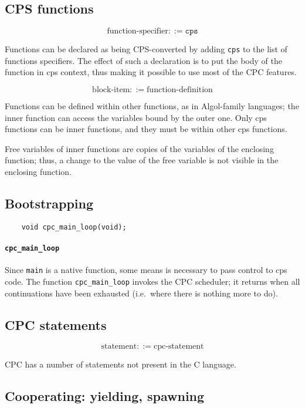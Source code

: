 \documentclass[a4paper]{report}
\begin{document}
\subsection{CPS functions} \label{sec:cpc-functions}

\[ \mbox{function-specifier} ::= \mathtt{cps} \]

Functions can be declared as being CPS-converted by adding {\tt cps}
to the list of functions specifiers.  The effect of such a declaration
is to put the body of the function in cps context, thus making it
possible to use most of the CPC features.

\[ \mbox{block-item} ::= \mbox{function-definition} \]

Functions can be defined within other functions, as in Algol-family
languages; the inner function can access the variables bound by the
outer one.  Only cps functions can be inner functions, and they must
be within other cps functions.

Free variables of inner functions are copies of the variables of the
enclosing function; thus, a change to the value of the free variable
is not visible in the enclosing function.

\subsection{Bootstrapping} \label{sec:bootstrapping}

\begin{verbatim}
    void cpc_main_loop(void);
\end{verbatim}

\paragraph{\tt cpc\_main\_loop} Since \verb|main| is a native
function, some means is necessary to pass control to cps code.  The
function \verb|cpc_main_loop| invokes the CPC scheduler; it returns
when all continuations have been exhausted (i.e.\ where there is
nothing more to do).

\subsection{CPC statements}

\[ \mbox{statement} ::= \mbox{cpc-statement} \]

CPC has a number of statements not present in the C language.

\subsection{Cooperating: yielding, spawning} \label{sec:cooperating}
\end{document}
